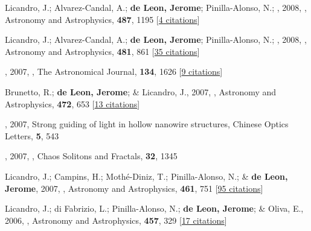 \item[{\color{numcolor}\scriptsize31}] Licandro, J.; Alvarez-Candal, A.; \textbf{de Leon, Jerome}; Pinilla-Alonso, N.; \etal, 2008, , Astronomy and Astrophysics, \textbf{487}, 1195 [\href{https://ui.adsabs.harvard.edu/abs/2008A&A...487.1195L}{4 citations}]

\item[{\color{numcolor}\scriptsize30}] Licandro, J.; Alvarez-Candal, A.; \textbf{de Leon, Jerome}; Pinilla-Alonso, N.; \etal, 2008, , Astronomy and Astrophysics, \textbf{481}, 861 [\href{https://ui.adsabs.harvard.edu/abs/2008A&A...481..861L}{35 citations}]

\item[{\color{numcolor}\scriptsize29}] , 2007, , The Astronomical Journal, \textbf{134}, 1626 [\href{https://ui.adsabs.harvard.edu/abs/2007AJ....134.1626C}{9 citations}]

\item[{\color{numcolor}\scriptsize28}] Brunetto, R.; \textbf{de Leon, Jerome}; \& Licandro, J., 2007, , Astronomy and Astrophysics, \textbf{472}, 653 [\href{https://ui.adsabs.harvard.edu/abs/2007A&A...472..653B}{13 citations}]

\item[{\color{numcolor}\scriptsize27}] , 2007, Strong guiding of light in hollow nanowire structures, Chinese Optics Letters, \textbf{5}, 543

\item[{\color{numcolor}\scriptsize26}] , 2007, , Chaos Solitons and Fractals, \textbf{32}, 1345

\item[{\color{numcolor}\scriptsize25}] Licandro, J.; Campins, H.; Moth{\'e}-Diniz, T.; Pinilla-Alonso, N.; \& \textbf{de Leon, Jerome}, 2007, , Astronomy and Astrophysics, \textbf{461}, 751 [\href{https://ui.adsabs.harvard.edu/abs/2007A&A...461..751L}{95 citations}]

\item[{\color{numcolor}\scriptsize24}] Licandro, J.; di Fabrizio, L.; Pinilla-Alonso, N.; \textbf{de Leon, Jerome}; \& Oliva, E., 2006, , Astronomy and Astrophysics, \textbf{457}, 329 [\href{https://ui.adsabs.harvard.edu/abs/2006A&A...457..329L}{17 citations}]

